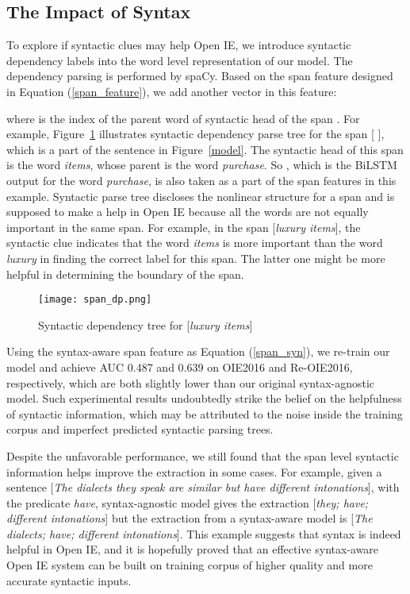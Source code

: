\documentclass[letterpaper]{article} \usepackage{aaai20}  \usepackage{times}  \usepackage{helvet} \usepackage{courier}  \usepackage[hyphens]{url}  \urlstyle{rm} \def\UrlFont{\rm}  \usepackage{graphicx}  \frenchspacing  \setlength{\pdfpagewidth}{8.5in}  \setlength{\pdfpageheight}{11in}
\begin{document}
\subsection{The Impact of Syntax}
To explore if syntactic clues may help Open IE, we introduce syntactic dependency labels into the word level representation of our model. The dependency parsing is performed by spaCy. Based on the span feature designed in Equation (\ref{span_feature}), we add another vector in this feature: 

where  is the index of the parent word of syntactic head of the span . For example, Figure~\ref{dp_span} illustrates syntactic dependency parse tree for the span [ ], which is a part of the sentence in Figure~\ref{model}. The syntactic head of this span is the word \emph{items}, whose parent is the word \emph{purchase}. So , which is the BiLSTM output for the word \emph{purchase}, is also taken as a part of the span features in this example. Syntactic parse tree discloses the nonlinear structure for a span and is supposed to make a help in Open IE because all the words are not equally important in the same span. For example, in the span [\emph{luxury items}], the syntactic clue indicates that the word \emph{items} is more important than the word \emph{luxury} in finding the correct label for this span. The latter one might be more helpful in determining the boundary of the span.

\begin{figure}[ht]
\begin{center}
\rule[-.5cm]{0cm}{0cm}\texttt{[image: span\_dp.png]}\rule[-.5cm]{0cm}{0cm}
\caption{Syntactic dependency tree for [\emph{luxury items}]}
\label{dp_span}
\end{center}
\end{figure}

Using the syntax-aware span feature as Equation (\ref{span_syn}), we re-train our model and achieve AUC 0.487 and 0.639 on OIE2016 and Re-OIE2016, respectively, which are both slightly lower than our original syntax-agnostic model. Such experimental results undoubtedly strike the belief on the helpfulness of syntactic information, which may be attributed to the noise inside the training corpus and imperfect predicted syntactic parsing trees. 

Despite the unfavorable performance, we still found that the span level syntactic information helps improve the extraction in some cases. For example, given a sentence [\emph{The dialects they speak are similar but have different intonations}], with the predicate \emph{have}, syntax-agnostic model gives the extraction [\emph{they; have; different intonations}] but the extraction from a syntax-aware model is [\emph{The dialects; have; different intonations}]. This example suggests that syntax is indeed helpful in Open IE, and it is hopefully proved that an effective syntax-aware Open IE system can be built on training corpus of higher quality and more accurate syntactic inputs.
\end{document}
